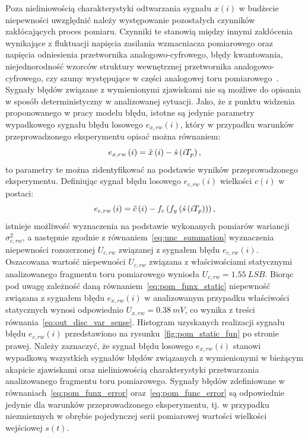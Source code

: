 Poza nieliniowością charakterystyki odtwarzania sygnału $x(i)$ w budżecie niepewności uwzględnić należy występowanie pozostałych czynników zakłócających proces pomiaru. Czynniki te stanowią między innymi zakłócenia wynikające z fluktuacji napięcia zasilania wzmacniacza pomiarowego oraz napięcia odniesienia przetwornika analogowo-cyfrowego, błędy kwantowania, niejednorodność wzorców struktury wewnętrznej przetwornika analogowo-cyfrowego, czy szumy występujące w części analogowej toru pomiarowego~\cite{stm_adc}. Sygnały błędów związane z wymienionymi zjawiskami nie są możliwe do opisania w sposób deterministyczny w analizowanej sytuacji. Jako, że z punktu widzenia proponowanego w pracy modelu błędu, istotne są jedynie parametry wypadkowego sygnału błędu losowego $e_{x,rw}(i)$, który w przypadku warunków przeprowadzonego eksperymentu opisać można równaniem:
\begin{equation}
e_{x,rw} \left(i\right) = \tilde{x} \left(i\right) - \dot{s} \left(iT_{p}\right) \label{eq:pom_funx_error},
\end{equation}
to parametry te można zidentyfikować na podstawie wyników przeprowadzonego eksperymentu. Definiując sygnał błędu losowego $e_{c,rw}(i)$ wielkości $c(i)$ w postaci:
\begin{equation}
e_{c,rw} \left(i\right) = \tilde{c} \left(i\right) - f_{c} \left(f_{y} \left(\dot{s} \left(iT_{p}\right)\right)\right) \label{eq:pom_func_error},
\end{equation}
istnieje możliwość wyznaczenia na podstawie wykonanych pomiarów wariancji $\sigma_{c,rw}^{2}$, a następnie zgodnie z równaniem~\eqref{eq:unc_summation} wyznaczenia niepewności rozszerzonej $U_{c,rw}$ związanej z sygnałem błędu $e_{c,rw}(i)$. Oszacowana wartość niepewności $U_{c,rw}$ związana z właściwościami statycznymi analizowanego fragmentu toru pomiarowego wyniosła $U_{c,rw} = \qty{1.55}{LSB}$. Biorąc pod uwagę zależność daną równaniem~\eqref{eq:pom_funx_static} niepewność związana z sygnałem błędu $e_{x,rw}(i)$ w analizowanym przypadku właściwości statycznych wynosi odpowiednio $U_{x,rw} = \qty{0.38}{mV}$, co wynika z treści równania~\eqref{eq:out_disc_var_sense}. Histogram uzyskanych realizacji sygnału błędu $e_{c,rw}(i)$ przedstawiono na rysunku~\ref{fig:pom_static_fun} po stronie prawej. Należy zaznaczyć, że sygnał błędu losowego $e_{x,rw}(i)$ stanowi wypadkową wszystkich sygnałów błędów związanych z wymienionymi w bieżącym akapicie zjawiskami oraz nieliniowością charakterystyki przetwarzania analizowanego fragmentu toru pomiarowego. Sygnały błędów zdefiniowane w równaniach~\eqref{eq:pom_funx_error} oraz~\eqref{eq:pom_func_error} są odpowiednie jedynie dla warunków przeprowadzonego eksperymentu, tj. w przypadku niezmiennych w obrębie pojedynczej serii pomiarowej wartości wielkości wejściowej $s(t)$.

